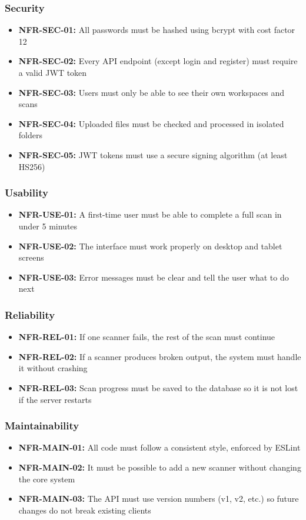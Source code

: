 \documentclass[12pt,a4paper]{report}
\begin{document}
\subsubsection{Security}
\begin{itemize}
    \item \textbf{NFR-SEC-01:} All passwords must be hashed using bcrypt with cost factor 12
    \item \textbf{NFR-SEC-02:} Every API endpoint (except login and register) must require a valid JWT token
    \item \textbf{NFR-SEC-03:} Users must only be able to see their own workspaces and scans
    \item \textbf{NFR-SEC-04:} Uploaded files must be checked and processed in isolated folders
    \item \textbf{NFR-SEC-05:} JWT tokens must use a secure signing algorithm (at least HS256)
\end{itemize}

\subsubsection{Usability}
\begin{itemize}
    \item \textbf{NFR-USE-01:} A first-time user must be able to complete a full scan in under 5 minutes
    \item \textbf{NFR-USE-02:} The interface must work properly on desktop and tablet screens
    \item \textbf{NFR-USE-03:} Error messages must be clear and tell the user what to do next
\end{itemize}

\subsubsection{Reliability}
\begin{itemize}
    \item \textbf{NFR-REL-01:} If one scanner fails, the rest of the scan must continue
    \item \textbf{NFR-REL-02:} If a scanner produces broken output, the system must handle it without crashing
    \item \textbf{NFR-REL-03:} Scan progress must be saved to the database so it is not lost if the server restarts
\end{itemize}

\subsubsection{Maintainability}
\begin{itemize}
    \item \textbf{NFR-MAIN-01:} All code must follow a consistent style, enforced by ESLint
    \item \textbf{NFR-MAIN-02:} It must be possible to add a new scanner without changing the core system
    \item \textbf{NFR-MAIN-03:} The API must use version numbers (v1, v2, etc.) so future changes do not break existing clients
\end{itemize}
\end{document}
